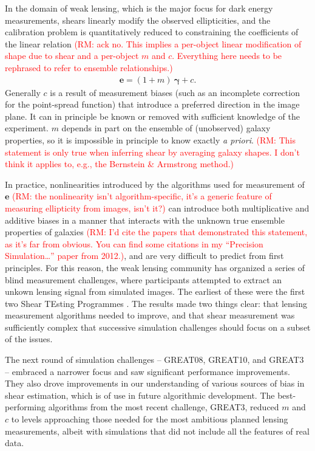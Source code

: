 \documentclass[iop]{emulateapj}
\newcommand\rmcomment[1]{\textcolor{red}{(RM: #1)}}
\begin{document}
In the domain of weak lensing, which is the major focus for
dark energy measurements, shears linearly modify the observed
ellipticities, and the calibration problem is quantitatively reduced
to constraining the coefficients of the linear relation
\rmcomment{ack no.  This implies a per-object linear modification of shape due to shear and a
  per-object $m$ and $c$.  Everything here needs to be rephrased to refer to ensemble relationships.}
\begin{align}
\boldsymbol{e} = (1+m)\:\boldsymbol{\gamma} + c.
\end{align}
Generally $c$ is a result of measurement biases (such as an incomplete
correction for the point-spread function) that introduce a preferred
direction in the image plane. It can in principle be known or removed
with sufficient knowledge of the experiment. $m$ depends in part on
the ensemble of (unobserved) galaxy properties, so it is impossible in
principle to know exactly {\it a priori}. \rmcomment{This statement is only true when inferring shear
  by averaging galaxy shapes.  I don't think it applies to, e.g., the Bernstein \& Armstrong method.}

In practice, nonlinearities introduced by the algorithms used for
measurement of $\boldsymbol{e}$ \rmcomment{the nonlinearity isn't algorithm-specific, it's a generic
  feature of measuring ellipticity from images, isn't it?} can introduce both multiplicative and
additive biases in a manner that interacts with the unknown true
ensemble properties of galaxies \rmcomment{I'd cite the papers that demonstrated this statement, as
  it's far from obvious. You can find some citations in my ``Precision Simulation\dots'' paper from 2012.}, and are very difficult to predict
from first principles. For this reason, the weak lensing community has
organized a series of blind measurement challenges, where participants
attempted to extract an unkown lensing signal from simulated images.
The earliest of these were the first two Shear TEsting Programmes
\citep[STEP1, STEP2]{2006MNRAS.368.1323H,2007MNRAS.376...13M}. The
results made two things clear: that lensing measurement algorithms
needed to improve, and that shear measurement was sufficiently complex that
successive simulation challenges should focus on a subset of the
issues.

The next round of simulation challenges -- GREAT08, GREAT10, and GREAT3
\citep{2009AnApS...3....6B,2013ApJS..205...12K, 2015MNRAS.450.2963M} --
embraced a narrower focus and saw significant performance
improvements. They also drove improvements in our understanding of 
various sources of bias in shear estimation, which is of use in future algorithmic development.  The best-performing algorithms from the
most recent challenge, GREAT3, reduced $m$ and $c$ to
levels approaching those needed for the most ambitious planned
lensing measurements, albeit with simulations that did not include all the features of real data.
\end{document}
